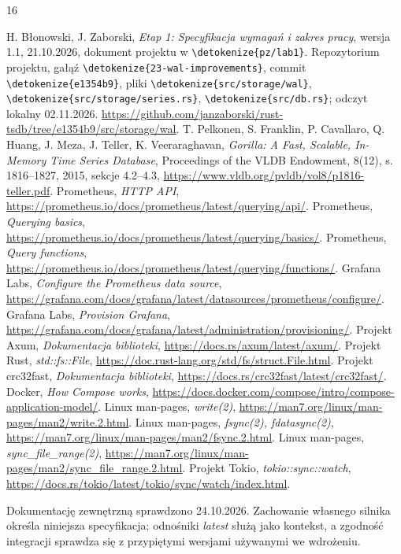 \documentclass[11pt,a4paper]{article}
\newcommand{\code}[1]{\expandafter\nolinkurl\expandafter{\detokenize{#1}}}
\begin{document}
\begingroup
\small
\begin{thebibliography}{16}
\raggedright
\setlength{\itemsep}{0pt}
H. Błonowski, J. Zaborski,
\emph{Etap 1: Specyfikacja wymagań i zakres pracy}, wersja 1.1,
21.10.2026, dokument projektu w \code{pz/lab1}.
Repozytorium projektu, gałąź \code{23-wal-improvements},
commit \code{e1354b9}, pliki \code{src/storage/wal},
\code{src/storage/series.rs}, \code{src/db.rs}; odczyt lokalny 02.11.2026.
\url{https://github.com/janzaborski/rust-tsdb/tree/e1354b9/src/storage/wal}.
T. Pelkonen, S. Franklin, P. Cavallaro, Q. Huang, J. Meza,
J. Teller, K. Veeraraghavan,
\emph{Gorilla: A Fast, Scalable, In-Memory Time Series Database},
Proceedings of the VLDB Endowment, 8(12), s. 1816--1827, 2015,
sekcje 4.2--4.3,
\url{https://www.vldb.org/pvldb/vol8/p1816-teller.pdf}.
Prometheus, \emph{HTTP API},
\url{https://prometheus.io/docs/prometheus/latest/querying/api/}.
Prometheus, \emph{Querying basics},
\url{https://prometheus.io/docs/prometheus/latest/querying/basics/}.
Prometheus, \emph{Query functions},
\url{https://prometheus.io/docs/prometheus/latest/querying/functions/}.
Grafana Labs, \emph{Configure the Prometheus data source},
\url{https://grafana.com/docs/grafana/latest/datasources/prometheus/configure/}.
Grafana Labs, \emph{Provision Grafana},
\url{https://grafana.com/docs/grafana/latest/administration/provisioning/}.
Projekt Axum, \emph{Dokumentacja biblioteki},
\url{https://docs.rs/axum/latest/axum/}.
Projekt Rust, \emph{std::fs::File},
\url{https://doc.rust-lang.org/std/fs/struct.File.html}.
Projekt crc32fast, \emph{Dokumentacja biblioteki},
\url{https://docs.rs/crc32fast/latest/crc32fast/}.
Docker, \emph{How Compose works},
\url{https://docs.docker.com/compose/intro/compose-application-model/}.
Linux man-pages, \emph{write(2)},
\url{https://man7.org/linux/man-pages/man2/write.2.html}.
Linux man-pages, \emph{fsync(2), fdatasync(2)},
\url{https://man7.org/linux/man-pages/man2/fsync.2.html}.
Linux man-pages, \emph{sync\_file\_range(2)},
\url{https://man7.org/linux/man-pages/man2/sync_file_range.2.html}.
Projekt Tokio, \emph{tokio::sync::watch},
\url{https://docs.rs/tokio/latest/tokio/sync/watch/index.html}.
\end{thebibliography}
\noindent Dokumentację zewnętrzną sprawdzono 24.10.2026.
Zachowanie własnego silnika określa niniejsza specyfikacja; odnośniki
\emph{latest} służą jako kontekst, a zgodność integracji sprawdza się
z przypiętymi wersjami używanymi we wdrożeniu.
\endgroup
\end{document}
